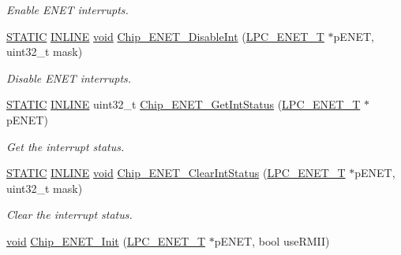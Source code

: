 \begin{DoxyCompactItemize}
\begin{DoxyCompactList}\small\item\em Enable E\-N\-E\-T interrupts. \end{DoxyCompactList}\item 
\hyperlink{group__LPC__Types__Public__Macros_ga10b2d890d871e1489bb02b7e70d9bdfb}{S\-T\-A\-T\-I\-C} \hyperlink{group__LPC__Types__Public__Types_ga2eb6f9e0395b47b8d5e3eeae4fe0c116}{I\-N\-L\-I\-N\-E} \hyperlink{Paradigm_2Tern__EE_2small_2portmacro_8h_a14d32f8130d3c0b212cfc751730b5b49}{void} \hyperlink{group__ENET__17XX__40XX_ga708d5e95e8c437779028713075a55117}{Chip\-\_\-\-E\-N\-E\-T\-\_\-\-Disable\-Int} (\hyperlink{structLPC__ENET__T}{L\-P\-C\-\_\-\-E\-N\-E\-T\-\_\-\-T} $\ast$p\-E\-N\-E\-T, uint32\-\_\-t mask)
\begin{DoxyCompactList}\small\item\em Disable E\-N\-E\-T interrupts. \end{DoxyCompactList}\item 
\hyperlink{group__LPC__Types__Public__Macros_ga10b2d890d871e1489bb02b7e70d9bdfb}{S\-T\-A\-T\-I\-C} \hyperlink{group__LPC__Types__Public__Types_ga2eb6f9e0395b47b8d5e3eeae4fe0c116}{I\-N\-L\-I\-N\-E} uint32\-\_\-t \hyperlink{group__ENET__17XX__40XX_ga5931404e2db29a1b4cdf357edf79504d}{Chip\-\_\-\-E\-N\-E\-T\-\_\-\-Get\-Int\-Status} (\hyperlink{structLPC__ENET__T}{L\-P\-C\-\_\-\-E\-N\-E\-T\-\_\-\-T} $\ast$p\-E\-N\-E\-T)
\begin{DoxyCompactList}\small\item\em Get the interrupt status. \end{DoxyCompactList}\item 
\hyperlink{group__LPC__Types__Public__Macros_ga10b2d890d871e1489bb02b7e70d9bdfb}{S\-T\-A\-T\-I\-C} \hyperlink{group__LPC__Types__Public__Types_ga2eb6f9e0395b47b8d5e3eeae4fe0c116}{I\-N\-L\-I\-N\-E} \hyperlink{Paradigm_2Tern__EE_2small_2portmacro_8h_a14d32f8130d3c0b212cfc751730b5b49}{void} \hyperlink{group__ENET__17XX__40XX_ga0a574e2cc8946c200d71152722ac30d7}{Chip\-\_\-\-E\-N\-E\-T\-\_\-\-Clear\-Int\-Status} (\hyperlink{structLPC__ENET__T}{L\-P\-C\-\_\-\-E\-N\-E\-T\-\_\-\-T} $\ast$p\-E\-N\-E\-T, uint32\-\_\-t mask)
\begin{DoxyCompactList}\small\item\em Clear the interrupt status. \end{DoxyCompactList}\item 
\hyperlink{Paradigm_2Tern__EE_2small_2portmacro_8h_a14d32f8130d3c0b212cfc751730b5b49}{void} \hyperlink{group__ENET__17XX__40XX_ga24a13ad31f70570906a4b885754f8953}{Chip\-\_\-\-E\-N\-E\-T\-\_\-\-Init} (\hyperlink{structLPC__ENET__T}{L\-P\-C\-\_\-\-E\-N\-E\-T\-\_\-\-T} $\ast$p\-E\-N\-E\-T, bool use\-R\-M\-I\-I)

\end{DoxyCompactItemize}
